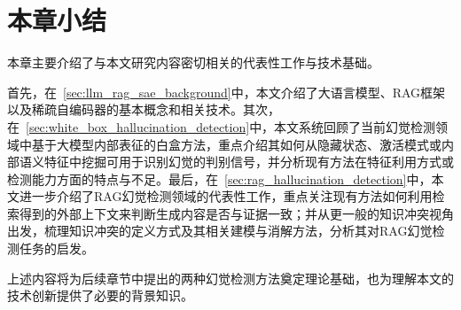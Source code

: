 \section{本章小结}


本章主要介绍了与本文研究内容密切相关的代表性工作与技术基础。

首先，在~\ref{sec:llm_rag_sae_background}中，本文介绍了大语言模型、RAG框架以及稀疏自编码器的基本概念和相关技术。其次，在~\ref{sec:white_box_hallucination_detection}中，本文系统回顾了当前幻觉检测领域中基于大模型内部表征的白盒方法，重点介绍其如何从隐藏状态、激活模式或内部语义特征中挖掘可用于识别幻觉的判别信号，并分析现有方法在特征利用方式或检测能力方面的特点与不足。最后，在~\ref{sec:rag_hallucination_detection}中，本文进一步介绍了RAG幻觉检测领域的代表性工作，重点关注现有方法如何利用检索得到的外部上下文来判断生成内容是否与证据一致；并从更一般的知识冲突视角出发，梳理知识冲突的定义方式及其相关建模与消解方法，分析其对RAG幻觉检测任务的启发。

上述内容将为后续章节中提出的两种幻觉检测方法奠定理论基础，也为理解本文的技术创新提供了必要的背景知识。
